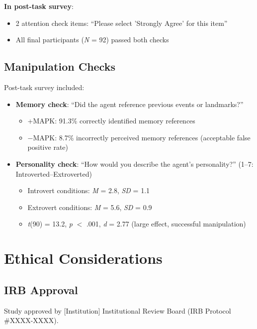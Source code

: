 \documentclass[12pt]{article}
\begin{document}
\textbf{In post-task survey}:
\begin{itemize}
    \item 2 attention check items: ``Please select 'Strongly Agree' for this item''
    \item All final participants (\textit{N} = 92) passed both checks
\end{itemize}

\subsection{Manipulation Checks}

Post-task survey included:
\begin{itemize}
    \item \textbf{Memory check}: ``Did the agent reference previous events or landmarks?''
    \begin{itemize}
        \item +MAPK: 91.3\% correctly identified memory references
        \item $-$MAPK: 8.7\% incorrectly perceived memory references (acceptable false positive rate)
    \end{itemize}
    
    \item \textbf{Personality check}: ``How would you describe the agent's personality?'' (1--7: Introverted--Extroverted)
    \begin{itemize}
        \item Introvert conditions: \textit{M} = 2.8, \textit{SD} = 1.1
        \item Extrovert conditions: \textit{M} = 5.6, \textit{SD} = 0.9
        \item \textit{t}(90) = 13.2, \textit{p} $<$ .001, \textit{d} = 2.77 (large effect, successful manipulation)
    \end{itemize}
\end{itemize}

\section{Ethical Considerations}

\subsection{IRB Approval}

Study approved by [Institution] Institutional Review Board (IRB Protocol \#XXXX-XXXX).
\end{document}
